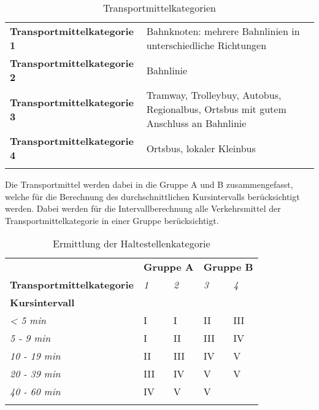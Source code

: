 \begin{longtable}{l p{10.6cm}}
        \midrule
        \textbf{Transportmittelkategorie 1}
                                & Bahnknoten: mehrere Bahnlinien in unterschiedliche Richtungen\\
        \textbf{Transportmittelkategorie 2}
                                & Bahnlinie\\
        \textbf{Transportmittelkategorie 3}
                                & Tramway, Trolleybuy, Autobus, Regionalbus, Ortsbus mit gutem Anschluss an Bahnlinie\\
        \textbf{Transportmittelkategorie 4}
                                & Ortsbus, lokaler Kleinbus\\
        \bottomrule
    \caption{Transportmittelkategorien}
    \label{table:Transportmittelkategorien}
\end{longtable}

Die Transportmittel werden dabei in die Gruppe A und B zusammengefasst, welche für die Berechnung des durchschnittlichen Kursintervalls berücksichtigt werden.
Dabei werden für die Intervallberechnung alle Verkehrsmittel der Transportmittelkategorie in einer Gruppe berücksichtigt.

\begin{longtable}[c]{l | p{2.3cm} p{2.3cm} | p{2.3cm} p{2.3cm}}
        \midrule
        \textbf{}
                                & \multicolumn{2}{l|}{\textbf{Gruppe A}}
                                & \multicolumn{2}{l}{\textbf{Gruppe B}}\\
        \textbf{Transportmittelkategorie}
                                & \textit{1}
                                & \textit{2}
                                & \textit{3}
                                & \textit{4}\\
        \textbf{Kursintervall}
                                &
                                &
                                &
                                &\\
        \textit{< 5 min}
                                & I
                                & I
                                & II
                                & III\\
        \textit{5 - 9 min}
                                & I
                                & II
                                & III
                                & IV\\
        \textit{10 - 19 min}
                                & II
                                & III
                                & IV
                                & V\\
        \textit{20 - 39 min}
                                & III
                                & IV
                                & V
                                & V\\
        \textit{40 - 60 min}
                                & IV
                                & V
                                & V
                                &\\
        \bottomrule
    \caption{Ermittlung der Haltestellenkategorie}
    \label{table:Ermittlung der Haltestellenkategorie}
\end{longtable}

